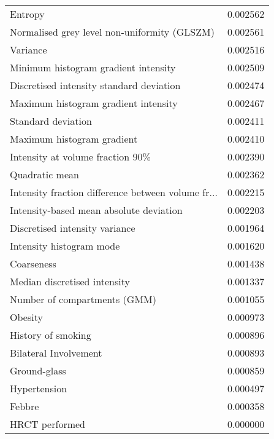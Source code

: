 \begin{longtable}{|lr|}
Entropy                                            &        0.002562 \\
Normalised grey level non-uniformity (GLSZM)       &        0.002561 \\
Variance                                           &        0.002516 \\
Minimum histogram gradient intensity               &        0.002509 \\
Discretised intensity standard deviation           &        0.002474 \\
Maximum histogram gradient intensity               &        0.002467 \\
Standard deviation                                 &        0.002411 \\
Maximum histogram gradient                         &        0.002410 \\
Intensity at volume fraction 90\%                   &        0.002390 \\
Quadratic mean                                     &        0.002362 \\
Intensity fraction difference between volume fr... &        0.002215 \\
Intensity-based mean absolute deviation            &        0.002203 \\
Discretised intensity variance                     &        0.001964 \\
Intensity histogram mode                           &        0.001620 \\
Coarseness                                         &        0.001438 \\
Median discretised intensity                       &        0.001337 \\
Number of compartments (GMM)                       &        0.001055 \\
Obesity                                            &        0.000973 \\
History of smoking                                 &        0.000896 \\
Bilateral Involvement                              &        0.000893 \\
Ground-glass                                       &        0.000859 \\
Hypertension                                       &        0.000497 \\
Febbre                                             &        0.000358 \\
HRCT performed                                     &        0.000000 \\

\end{longtable}
